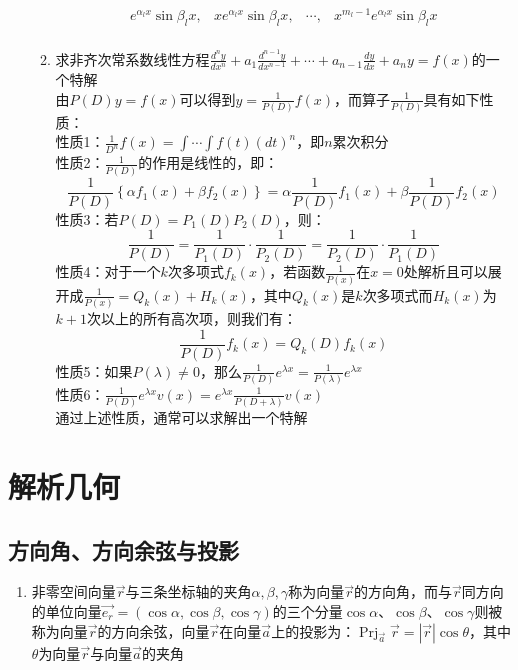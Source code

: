 \documentclass[12pt,a4paper,UTF8]{book}
\begin{document}
\begin{enumerate}
\begin{enumerate}
\[\begin{matrix}
e^{\alpha_lx}\sin\beta_lx,&xe^{\alpha_lx}\sin\beta_lx,&\cdots,&x^{m_l-1}e^{\alpha_lx}\sin\beta_lx\\
\end{matrix}\]
\item 求非齐次常系数线性方程$\frac{d^ny}{dx^n}+a_1\frac{d^{n-1}y}{dx^{n-1}}+\cdots+a_{n-1}\frac{dy}{dx}+a_ny=f\left(x\right)$的一个特解\\
由$P\left(D\right)y=f\left(x\right)$可以得到$y=\frac{1}{P\left(D\right)}f\left(x\right)$，而算子$\frac{1}{P\left(D\right)}$具有如下性质：\\
性质1：$\frac{1}{D^n}f\left(x\right)=\int\cdots\int f\left(t\right)\left(dt\right)^n$，即$n$累次积分\\
性质2：$\frac{1}{P\left(D\right)}$的作用是线性的，即：
\[\frac{1}{P\left(D\right)}\left\{\alpha f_1\left(x\right)+\beta f_2\left(x\right)\right\}=\alpha\frac{1}{P\left(D\right)}f_1\left(x\right)+\beta\frac{1}{P\left(D\right)}f_2\left(x\right)\]
性质3：若$P\left(D\right)=P_1\left(D\right)P_2\left(D\right)$，则：
\[\frac{1}{P\left(D\right)}=\frac{1}{P_1\left(D\right)}\cdot\frac{1}{P_2\left(D\right)}=\frac{1}{P_2\left(D\right)}\cdot\frac{1}{P_1\left(D\right)}\]
性质4：对于一个$k$次多项式$f_k\left(x\right)$，若函数$\frac{1}{P\left(x\right)}$在$x=0$处解析且可以展开成$\frac{1}{P\left(x\right)}=Q_k\left(x\right)+H_k\left(x\right)$，其中$Q_k\left(x\right)$是$k$次多项式而$H_k\left(x\right)$为$k+1$次以上的所有高次项，则我们有：
\[\frac{1}{P\left(D\right)}f_k\left(x\right)=Q_k\left(D\right)f_k\left(x\right)\]
性质5：如果$P\left(\lambda\right)\ne0$，那么$\frac{1}{P\left(D\right)}e^{\lambda x}=\frac{1}{P\left(\lambda\right)}e^{\lambda x}$\\
性质6：$\frac{1}{P\left(D\right)}e^{\lambda x}v\left(x\right)=e^{\lambda x}\frac{1}{P\left(D+\lambda\right)}v\left(x\right)$\\
通过上述性质，通常可以求解出一个特解
\end{enumerate}
\end{enumerate}


\section{解析几何}
\subsection{方向角、方向余弦与投影}
\begin{enumerate}
\item 非零空间向量$\vec{r}$与三条坐标轴的夹角$\alpha,\beta,\gamma$称为向量$\vec{r}$的方向角，而与$\vec{r}$同方向的单位向量$\vec{e_r}=\left(\cos\alpha,\cos\beta,\cos\gamma\right)$的三个分量$\cos\alpha$、$\cos\beta$、$\cos\gamma$则被称为向量$\vec{r}$的方向余弦，向量$\vec{r}$在向量$\vec{a}$上的投影为：$\operatorname{Prj}_{\vec{a}}\vec{r}=\left|\vec{r}\right|\cos\theta$，其中$\theta$为向量$\vec{r}$与向量$\vec{a}$的夹角
\end{enumerate}
\end{document}
